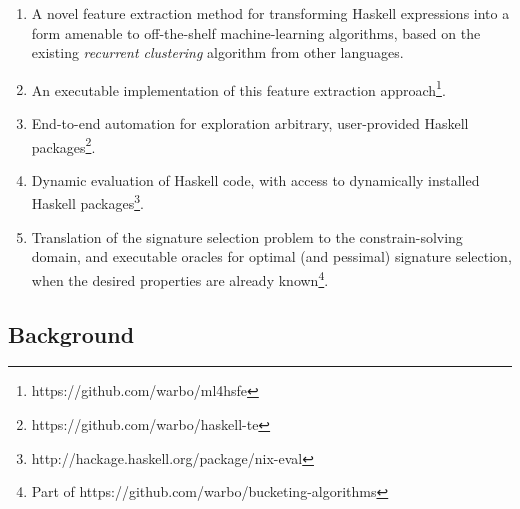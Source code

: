 \begin{enumerate}
\item A novel feature extraction method for transforming Haskell expressions
  into a form amenable to off-the-shelf machine-learning algorithms, based on
  the existing \emph{recurrent clustering} algorithm from other languages.
\item An executable implementation of this feature extraction
  approach\footnote{https://github.com/warbo/ml4hsfe}.
\item End-to-end automation for exploration arbitrary, user-provided Haskell
  packages\footnote{https://github.com/warbo/haskell-te}.
\item Dynamic evaluation of Haskell code, with access to dynamically installed
  Haskell packages\footnote{http://hackage.haskell.org/package/nix-eval}.
\item Translation of the signature selection problem to the constrain-solving domain, and
  executable oracles for optimal (and pessimal) signature selection, when the desired
  properties are already known\footnote{Part of
    https://github.com/warbo/bucketing-algorithms}.
\end{enumerate}

\iffalse
We describe theory exploration in more detail, as well as the \qspec{} tool we
use in our experiments, in \S~\ref{sec:theoryexploration}. We introduce the
signature selection problem more formally in \S~\ref{sec:sigselect} and measure its
effect on theory exploration systems in \S~\ref{sec:implementation}. In
\S~\ref{sec:clustering} we highlight the difference between signature selection and the
well-known \emph{clustering problem} from machine learning, by demonstrating
that clustering algorithms perform poorly at signature selection.  A variety of related
work is surveyed in \S~\ref{sec:related} and we conclude in
\S~\ref{sec:conclusion} with potential directions for future research.
\fi

\subsection{Background}
\label{sec:background}

